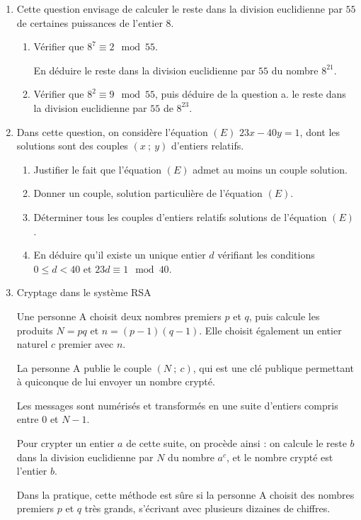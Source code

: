 \documentclass[10pt]{article}
\begin{document}
\begin{enumerate}
\item Cette question envisage de calculer le reste dans la division euclidienne par $55$ de certaines
puissances de l'entier $8$.
	\begin{enumerate}
		\item Vérifier que $8^7 \equiv 2 \mod 55$.
		
En déduire le reste dans la division euclidienne par $55$ du nombre $8^{21}$.
		\item Vérifier que $8^2 \equiv 9 \mod 55$, puis déduire de la question a. le reste dans la division
euclidienne par $55$ de $8^{23}$.
 	\end{enumerate}
\item  Dans cette question, on considère l'équation $(E)$\: $23 x - 40 y = 1$, dont les solutions sont des
couples $(x~;~y)$ d'entiers relatifs.
	\begin{enumerate}
		\item Justifier le fait que l'équation $(E)$ admet au moins un couple solution.
		\item  Donner un couple, solution particulière de l'équation $(E)$.
		\item  Déterminer tous les couples d'entiers relatifs solutions de l'équation $(E)$.
		\item  En déduire qu'il existe un unique entier $d$ vérifiant les conditions $0 \leqslant d < 40$ et
$23 d \equiv  1 \mod 40$.
 	\end{enumerate}
\item  Cryptage dans le système RSA
	
Une personne A choisit deux nombres premiers $p$ et $q$, puis calcule les produits $N = p q$ et
$n = (p - 1)(q - 1)$. Elle choisit également un entier naturel $c$ premier avec $n$.
	
La personne A publie le couple $(N~;~c)$, qui est une clé publique permettant à quiconque de lui
envoyer un nombre crypté.
	
Les messages sont numérisés et transformés en une suite d'entiers compris entre $0$ et $N -1$.
	
Pour crypter un entier $a$ de cette suite, on procède ainsi : on calcule le reste $b$ dans la division
euclidienne par $N$ du nombre $a^c$, et le nombre crypté est l'entier $b$.

\smallskip

Dans la pratique, cette méthode est sûre si la personne A choisit des nombres premiers $p$ et $q$
très grands, s'écrivant avec plusieurs dizaines de chiffres.


\end{enumerate}
\end{document}
